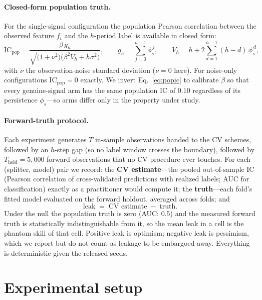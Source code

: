 \documentclass[11pt]{article}
\newcommand{\IC}{\mathrm{IC}}
\begin{document}
\paragraph{Closed-form population truth.} For the single-signal configuration
the population Pearson correlation between the observed feature $f_t$ and
the $h$-period label is available in closed form:
\begin{equation}
\IC_{\mathrm{pop}}
= \frac{\beta\, g_h}{\sqrt{\big(1+\nu^2\big)\big(\beta^2 V_h + h\sigma^2\big)}},
\qquad
g_h = \sum_{j=0}^{h-1}\phi_s^{\,j},
\qquad
V_h = h + 2\sum_{d=1}^{h-1}(h-d)\,\phi_s^{\,d},
\label{eq:popic}
\end{equation}
with $\nu$ the observation-noise standard deviation ($\nu = 0$ here). For
noise-only configurations $\IC_{\mathrm{pop}} = 0$ exactly. We invert
Eq.~\eqref{eq:popic} to calibrate $\beta$ so that every genuine-signal arm
has the same population IC of $0.10$ regardless of its persistence
$\phi_s$---so arms differ only in the property under study.

\paragraph{Forward-truth protocol.} Each experiment generates $T$ in-sample
observations handed to the CV schemes, followed by an $h$-step gap (so no
label window crosses the boundary), followed by $T_{\text{hold}} = 5{,}000$
forward observations that no CV procedure ever touches. For each (splitter,
model) pair we record: the \textbf{CV estimate}---the pooled out-of-sample IC
(Pearson correlation of cross-validated predictions with realized labels;
AUC for classification) exactly as a practitioner would compute it; the
\textbf{truth}---each fold's fitted model evaluated on the forward holdout,
averaged across folds; and
\begin{equation}
\text{leak} \;=\; \text{CV estimate} \;-\; \text{truth}.
\label{eq:leak}
\end{equation}
Under the null the population truth is zero (AUC: $0.5$) and the measured
forward truth is statistically indistinguishable from it, so the mean leak
in a cell is the phantom skill of that cell. Positive leak is optimism;
negative leak is pessimism, which we report but do not count as leakage to
be embargoed away. Everything is deterministic given the released seeds.

\section{Experimental setup}
\label{sec:setup}
\end{document}
